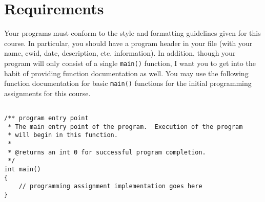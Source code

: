 \documentclass[11pt]{article}
\begin{document}
\section*{Requirements}
\label{sec-4}

Your programs must conform to the style and formatting guidelines
given for this course.  In particular, you should have a program
header in your file (with your name, cwid, date, description,
etc. information).  In addition, though your program will only consist
of a single \verb~main()~ function, I want you to get into the habit of
providing function documentation as well.  You may use the following
function documentation for basic \verb~main()~ functions for the initial
programming assignments for this course.


\begin{verbatim}

/** program entry point
 * The main entry point of the program.  Execution of the program
 * will begin in this function.
 *
 * @returns an int 0 for successful program completion.
 */
int main()
{
    // programming assignment implementation goes here
}
\end{verbatim}
\end{document}
